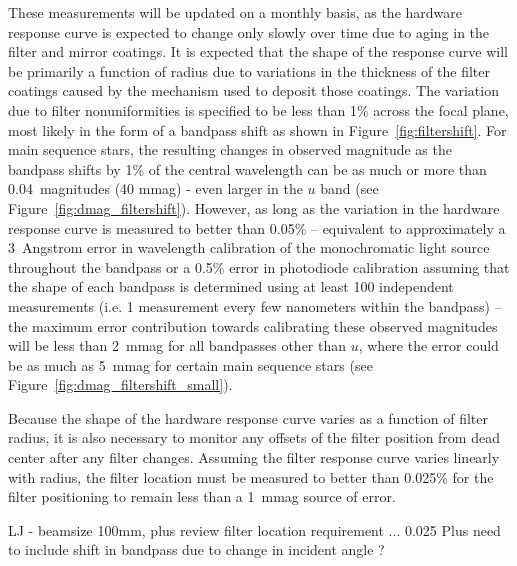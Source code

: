 \documentclass[12pt,preprint]{aastex}
\begin{document}
These measurements will be updated on a monthly basis, as the hardware
response curve is expected to change only slowly over time due to
aging in the filter and mirror coatings. It is expected that the shape
of the response curve will be primarily a function of radius due to
variations in the thickness of the filter coatings caused by the
mechanism used to deposit those coatings. The variation due to filter
nonuniformities is specified to be less than 1\% across the focal
plane, most likely in the form of a bandpass shift as shown in
Figure~\ref{fig:filtershift}. For main sequence stars, the resulting
changes in observed magnitude as the bandpass shifts by 1\% of the
central wavelength can be as much or more than 0.04~magnitudes (40
mmag) - even larger in the $u$ band (see
Figure~\ref{fig:dmag_filtershift}). However, as long as the variation
in the hardware response curve is measured to better than 0.05\% --
equivalent to approximately a 3~Angstrom error in wavelength
calibration of the monochromatic light source throughout the bandpass
or a 0.5\% error in photodiode calibration assuming that the shape of
each bandpass is determined using at least 100 independent
measurements (i.e. 1 measurement every few nanometers within the bandpass) --
the maximum error contribution towards calibrating these observed magnitudes
will be less than 2~mmag for all bandpasses other than $u$, where the
error could be as much as 5~mmag for certain main sequence stars (see
Figure~\ref{fig:dmag_filtershift_small}). 

Because the shape of the hardware response curve varies as a function
of filter radius, it is also necessary to monitor any offsets of the
filter position from dead center after any filter changes. Assuming
the filter response curve varies linearly with radius, the filter
location must be measured to better than 0.025\%  for the filter
positioning to remain less than a 1~mmag source of error. 

LJ - beamsize 100mm, plus review filter location requirement ... 0.025%
Plus need to include shift in bandpass due to change in incident angle ? 
\end{document}
